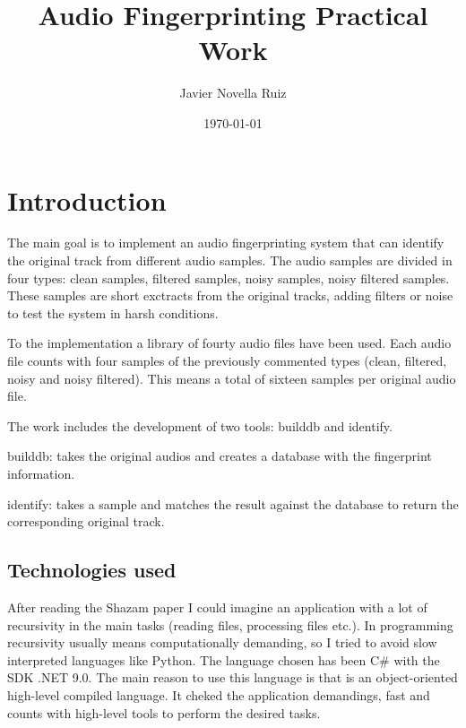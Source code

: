 \documentclass[11pt, a4paper]{article}
\title{Audio Fingerprinting Practical Work}
\author{Javier Novella Ruiz}
\date{\today}
\begin{document}
    

    \tableofcontents

    \newpage

    \section{Introduction}

    The main goal is to implement an audio fingerprinting system that can identify the original track from different audio samples.
    The audio samples are divided in four types: clean samples, filtered samples, noisy samples, noisy filtered samples. These samples
    are short exctracts from the original tracks, adding filters or noise to test the system in harsh conditions.

    \vspace{1em} To the implementation a library of fourty audio files have been used. Each audio file counts with four samples of the previously 
    commented types (clean, filtered, noisy and noisy filtered). This means a total of sixteen samples per original audio file.

    \vspace{1em} The work includes the development of two tools: builddb and identify.
    \begin{list}
        \item builddb: takes the original audios and creates a database with the fingerprint information.
        \item identify: takes a sample and matches the result against the database to return the corresponding original track.
    \end{list}

    \subsection{Technologies used}
    
    After reading the Shazam paper \cite{ShazamAlgorithmPaper} I could imagine an application with a lot of recursivity in the main tasks 
    (reading files, processing files etc.). In programming recursivity usually means computationally demanding, so I tried to avoid slow 
    interpreted languages like Python. The language chosen has been C# \cite{PythonVsCSharp} with the SDK .NET 9.0. The main reason to use this 
    language is that is an object-oriented high-level compiled language. It cheked the application demandings, fast and counts with high-level 
    tools to perform the desired tasks.
\end{document}
